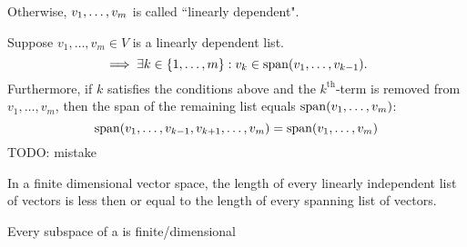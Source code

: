 \begin{mydef} 
  Otherwise, $v_1, \dots, v_m$ is called ``linearly dependent".
\end{mydef}




\setcounter{thm}{18}
\begin{thm} 
  \label{linear-dependence-lemma}
  Suppose $v_{1}, \dots, v_{m}\in V$ is a linearly dependent list.
  \begin{equation}
    \implies \exists k \in \{ 1, \dots, m \} : v_k \in \operatorname{span} (v_1, \dots, v_{k-1}).
  \end{equation}
  Furthermore, if $k$ satisfies the conditions above and the $k^{\text{th}}$-term is removed from $v_1, \dots, v_m$, then the span of the remaining list equals $\operatorname{span} (v_1, \dots, v_{m})$:
  \begin{equation}
    \operatorname{span} (v_1, \dots, v_{k-1}, v_{k+1}, \dots, v_m) = \operatorname{span} (v_1, \dots, v_m)
  \end{equation}
  TODO: mistake
\end{thm}

\setcounter{thm}{21}

\begin{thm}  
  \label{length-of-linearly-dependent-list-less-or-equal-length-of-spanning-list}
  In a finite dimensional vector space, the length of every linearly independent list of vectors is less then or equal to the length of every spanning list of vectors.
\end{thm}

\setcounter{thm}{24}
\begin{thm} 
  Every subspace of a \findimvs is finite\-/dimensional
\end{thm}
